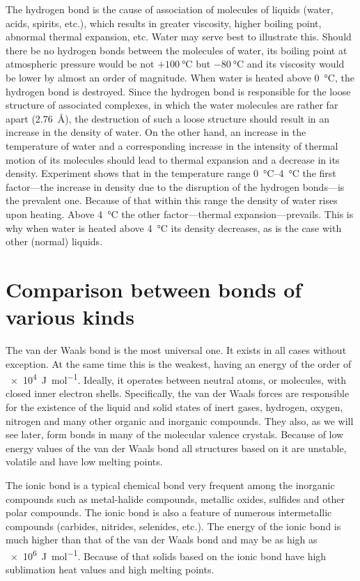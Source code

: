 The hydrogen bond is the cause of association of molecules of liquids (water, acids, spirits, etc.), which results in greater viscosity, higher boiling point, abnormal thermal expansion, etc. Water may serve best to illustrate this. Should there be no hydrogen bonds between the molecules of water, its boiling point at atmospheric pressure would be not $+\SI{100}{\degreeCelsius}$ but $-\SI{80}{\degreeCelsius}$ and its viscosity would be lower by almost an order of magnitude. When water is heated above \SI{0}{\degreeCelsius}, the hydrogen bond is destroyed. Since the hydrogen bond is responsible for the loose structure of associated complexes, in which the water molecules are rather far apart (\SI{2.76}{\angstrom}), the destruction of such a loose structure should result in an increase in the density of water. On the other hand, an increase in the temperature of water and a corresponding increase in the intensity of thermal motion of its molecules should lead to thermal expansion and a decrease in its density. Experiment shows that in the temperature range \SIrange{0}{4}{\degreeCelsius} the first factor---the increase in density due to the disruption of the hydrogen bonds---is the prevalent one. Because of that within this range the density of water rises upon heating. Above \SI{4}{\degreeCelsius} the other factor---thermal expansion---prevails. This is why when water is heated above \SI{4}{\degreeCelsius} its density decreases, as is the case with other (normal) liquids.

\section{Comparison between bonds of various kinds}\label{sec:1_6}

The van der Waals bond is the most universal one. It exists in all cases without exception. At the same time this is the weakest, having an energy of the order of \SI{e4}{\joule\per\mole}. Ideally, it operates between neutral atoms, or molecules, with closed inner electron shells. Specifically, the van der Waals forces are responsible for the existence of the liquid and solid states of inert gases, hydrogen, oxygen, nitrogen and many other organic and inorganic compounds. They also, as we will see later, form bonds in many of the molecular valence crystals. Because of low energy values of the van der Waals bond all structures based on it are unstable, volatile and have low melting points.

The ionic bond is a typical chemical bond very frequent among the inorganic compounds such as metal-halide compounds, metallic oxides, sulfides and other polar compounds. The ionic bond is also a feature of numerous intermetallic compounds (carbides, nitrides, selenides, etc.). The energy of the ionic bond is much higher than that of the van der Waals bond and may be as high as \SI{e6}{\joule\per\mole}. Because of that solids based on the ionic bond have high sublimation heat values and high melting points.

